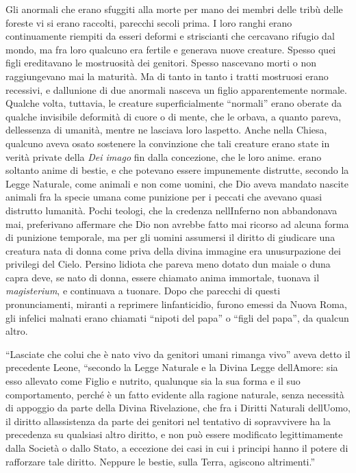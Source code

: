 Gli anormali che erano sfuggiti alla morte per mano dei membri delle
tribù delle foreste vi si erano raccolti, parecchi secoli prima. I loro
ranghi erano continuamente riempiti da esseri deformi e striscianti che
cercavano rifugio dal mondo, ma fra loro qualcuno era fertile e generava
nuove creature. Spesso quei figli ereditavano le mostruosità dei
genitori. Spesso nascevano morti o non raggiungevano mai la maturità. Ma
di tanto in tanto i tratti mostruosi erano recessivi, e
dall\textquotesingle unione di due anormali nasceva un figlio
apparentemente normale. Qualche volta, tuttavia, le creature
superficialmente ``normali'' erano oberate da qualche invisibile
deformità di cuore o di mente, che le orbava, a quanto pareva,
dell\textquotesingle essenza di umanità, mentre ne lasciava loro
l\textquotesingle aspetto. Anche nella Chiesa, qualcuno aveva osato
sostenere la convinzione che tali creature erano state in verità private
della \emph{Dei imago} fin dalla concezione, che le loro anime. erano
soltanto anime di bestie, e che potevano essere impunemente distrutte,
secondo la Legge Naturale, come animali e non come uomini, che Dio aveva
mandato nascite animali fra la specie umana come punizione per i peccati
che avevano quasi distrutto l\textquotesingle umanità. Pochi teologi,
che la credenza nell\textquotesingle Inferno non abbandonava mai,
preferivano affermare che Dio non avrebbe fatto mai ricorso ad alcuna
forma di punizione temporale, ma per gli uomini assumersi il diritto di
giudicare una creatura nata di donna come priva della divina immagine
era un\textquotesingle usurpazione dei privilegi del Cielo. Persino
l\textquotesingle idiota che pareva meno dotato d\textquotesingle un
maiale o d\textquotesingle una capra deve, se nato di donna, essere
chiamato anima immortale, tuonava il \emph{magisterium}, e continuava a
tuonare. Dopo che parecchi di questi pronunciamenti, miranti a reprimere
l\textquotesingle infanticidio, furono emessi da Nuova Roma, gli
infelici malnati erano chiamati ``nipoti del papa'' o ``figli del
papa'', da qualcun altro.

``Lasciate che colui che è nato vivo da genitori umani rimanga vivo''
aveva detto il precedente Leone, ``secondo la Legge Naturale e la Divina
Legge dell\textquotesingle Amore: sia esso allevato come Figlio e
nutrito, qualunque sia la sua forma e il suo comportamento, perché è un
fatto evidente alla ragione naturale, senza necessità di appoggio da
parte della Divina Rivelazione, che fra i Diritti Naturali
dell\textquotesingle Uomo, il diritto all\textquotesingle assistenza da
parte dei genitori nel tentativo di sopravvivere ha la precedenza su
qualsiasi altro diritto, e non può essere modificato legittimamente
dalla Società o dallo Stato, a eccezione dei casi in cui i principi
hanno il potere di rafforzare tale diritto. Neppure le bestie, sulla
Terra, agiscono altrimenti.''

